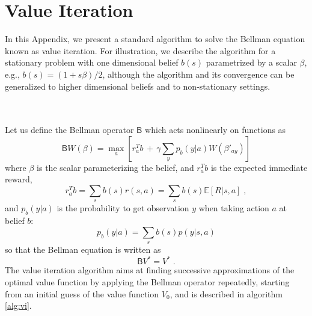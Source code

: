 \documentclass[aps,nofootinbib,groupaddress,superscriptaddress,reprint,amsmath,amssymb,graphicx,onecolumn,prx]{revtex4-2}
\begin{document}
\clearpage
\appendix


\section{Value Iteration}
\label{app:value_iteration}
\noindent In this Appendix, we present a standard algorithm to solve the Bellman equation known as value iteration. For illustration, we describe the algorithm for a stationary problem with one dimensional belief $b(s)$ parametrized by a scalar $\beta$, e.g., $b(s) = (1 + s \beta) / 2$, although the algorithm and its convergence can be generalized to higher dimensional beliefs and to non-stationary settings.

\textcolor{magenta}{
}
\\ \\
Let us define the Bellman operator $\mathsf{B}$ which acts nonlinearly on functions as
\begin{equation}
    \mathsf{B} W (\beta) = \max_a\left[r_a^Tb\,+\,\gamma  \sum_yp_b(y|a)W(\beta'_{ay})\right]
\end{equation}
where $\beta$ is the scalar parameterizing the belief, and $r_a^Tb$ is the expected immediate reward,
\begin{equation}
    r_a^Tb=\sum_s b(s)r(s,a)=\sum_s b(s)\mathbb{E}[R|s,a] \; ,
\end{equation}
and $p_b(y|a)$ is the probability to get observation $y$ when taking action $a$ at belief $b$:
\begin{equation}
    p_b(y|a)=\sum_s b(s)p(y|s,a)
\end{equation}
so that the Bellman equation is written as
\begin{equation}
    \mathsf{B}V^*=V^* \; .
\end{equation}
The value iteration algorithm aims at finding successive approximations of the optimal value function by applying the Bellman operator repeatedly, starting from an initial guess of the value function $V_0$, and is described in algorithm \ref{alg:vi}.
\end{document}
